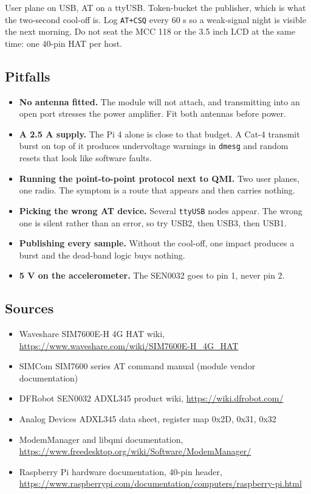 User plane on USB, AT on a ttyUSB. Token-bucket the publisher, which is what the two-second cool-off is. Log \texttt{AT+CSQ} every 60 s so a weak-signal night is visible the next morning. Do not seat the MCC 118 or the 3.5 inch LCD at the same time: one 40-pin HAT per host.

\subsection*{Pitfalls}

\begin{itemize}
\item \textbf{No antenna fitted.} The module will not attach, and transmitting into an open port stresses the power amplifier. Fit both antennas before power.
\item \textbf{A 2.5 A supply.} The Pi 4 alone is close to that budget. A Cat-4 transmit burst on top of it produces undervoltage warnings in \texttt{dmesg} and random resets that look like software faults.
\item \textbf{Running the point-to-point protocol next to QMI.} Two user planes, one radio. The symptom is a route that appears and then carries nothing.
\item \textbf{Picking the wrong AT device.} Several \texttt{ttyUSB} nodes appear. The wrong one is silent rather than an error, so try USB2, then USB3, then USB1.
\item \textbf{Publishing every sample.} Without the cool-off, one impact produces a burst and the dead-band logic buys nothing.
\item \textbf{5 V on the accelerometer.} The SEN0032 goes to pin 1, never pin 2.
\end{itemize}

\subsection*{Sources}

\begin{itemize}
\item Waveshare SIM7600E-H 4G HAT wiki, \url{https://www.waveshare.com/wiki/SIM7600E-H_4G_HAT}
\item SIMCom SIM7600 series AT command manual (module vendor documentation)
\item DFRobot SEN0032 ADXL345 product wiki, \url{https://wiki.dfrobot.com/}
\item Analog Devices ADXL345 data sheet, register map 0x2D, 0x31, 0x32
\item ModemManager and libqmi documentation, \url{https://www.freedesktop.org/wiki/Software/ModemManager/}
\item Raspberry Pi hardware documentation, 40-pin header, \url{https://www.raspberrypi.com/documentation/computers/raspberry-pi.html}
\end{itemize}
